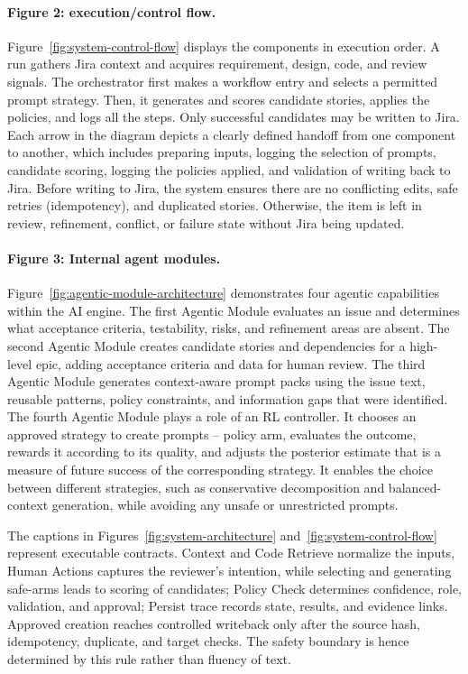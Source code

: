 \documentclass[pdflatex,sn-basic]{sn-jnl}
\begin{document}
\paragraph{Figure 2: execution/control flow.}
Figure~\ref{fig:system-control-flow} displays the components in execution order. A run gathers Jira context and acquires requirement, design, code, and review signals. The orchestrator first makes a workflow entry and selects a permitted prompt strategy. Then, it generates and scores candidate stories, applies the policies, and logs all the steps. Only successful candidates may be written to Jira. Each arrow in the diagram depicts a clearly defined handoff from one component to another, which includes preparing inputs, logging the selection of prompts, candidate scoring, logging the policies applied, and validation of writing back to Jira. Before writing to Jira, the system ensures there are no conflicting edits, safe retries (idempotency), and duplicated stories. Otherwise, the item is left in review, refinement, conflict, or failure state without Jira being updated.

\paragraph{Figure 3: Internal agent modules.}
Figure~\ref{fig:agentic-module-architecture} demonstrates four agentic capabilities within the AI engine. The first Agentic Module evaluates an issue and determines what acceptance criteria, testability, risks, and refinement areas are absent. The second Agentic Module creates candidate stories and dependencies for a high-level epic, adding acceptance criteria and data for human review. The third Agentic Module generates context-aware prompt packs using the issue text, reusable patterns, policy constraints, and information gaps that were identified. The fourth Agentic Module plays a role of an RL controller. It chooses an approved strategy to create prompts -- policy arm, evaluates the outcome, rewards it according to its quality, and adjusts the posterior estimate that is a measure of future success of the corresponding strategy. It enables the choice between different strategies, such as conservative decomposition and balanced-context generation, while avoiding any unsafe or unrestricted prompts.

The captions in Figures~\ref{fig:system-architecture} and~\ref{fig:system-control-flow} represent executable contracts. Context and Code Retrieve normalize the inputs, Human Actions captures the reviewer’s intention, while selecting and generating safe-arms leads to scoring of candidates; Policy Check determines confidence, role, validation, and approval; Persist trace records state, results, and evidence links. Approved creation reaches controlled writeback only after the source hash, idempotency, duplicate, and target checks. The safety boundary is hence determined by this rule rather than fluency of text.
\end{document}
